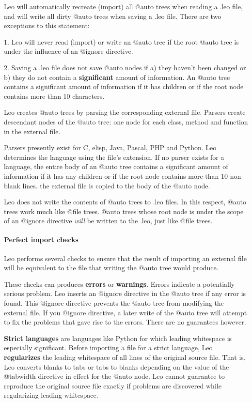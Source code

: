 \documentclass[a4paper,10pt,english]{sphinxmanual}
\begin{document}
Leo will automatically recreate (import) all @auto trees when reading a .leo
file, and will write all dirty @auto trees when saving a .leo file. There are
two exceptions to this statement:

1. Leo will never read (import) or write an @auto tree if
the root @auto tree is under the influence of an @ignore directive.

2. Saving a .leo file does not save @auto nodes if a) they haven't been changed
or b) they do not contain a \textbf{significant} amount of information. An @auto tree
contains a significant amount of information if it has  children or if the
root node contains more than 10 characters.

Leo creates @auto trees by parsing the corresponding external file. Parsers
create descendant nodes of the @auto tree: one node for each class, method and
function in the external file.

Parsers presently exist for C, elisp, Java, Pascal, PHP and Python. Leo
determines the language using the file's extension. If no parser exists for a
language, the entire body of an @auto tree contains a significant amount of
information if it has any children or if the root node contains more than 10
non-blank lines. the external file is copied to the body of the @auto node.

Leo does not write the contents of @auto trees to .leo files. In this respect,
@auto trees work much like @file trees. @auto trees whose root node is under the
scope of an @ignore directive \emph{will} be written to the .leo, just like @file
trees.


\paragraph{Perfect import checks}
\label{what-is-new:perfect-import-checks}
Leo performs several checks to ensure that the result of importing an external
file will be equivalent to the file that writing the @auto tree would produce.

These checks can produces \textbf{errors} or \textbf{warnings}. Errors indicate a
potentially serious problem. Leo inserts an @ignore directive in the @auto tree
if any error is found. This @ignore directive prevents the @auto tree from
modifying the external file. If you @ignore directive, a later write of the
@auto tree will attempt to fix the problems that gave rise to the errors. There
are no guarantees however.

\textbf{Strict languages} are languages like Python for which leading whitespace is
especially significant. Before importing a file for a strict language, Leo
\textbf{regularizes} the leading whitespace of all lines of the original source file.
That is, Leo converts blanks to tabs or tabs to blanks depending on the value of
the @tabwidth directive in effect for the @auto node. Leo cannot guarantee to
reproduce the original source file exactly if problems are discovered while
regularizing leading whitespace.
\end{document}
